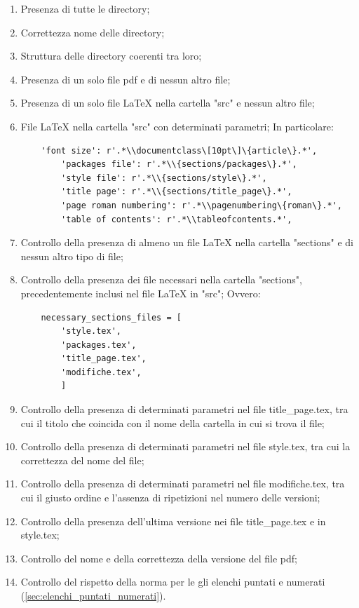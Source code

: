 \begin{enumerate}
	\item Presenza di tutte le directory;
	\item Correttezza nome delle directory;
	\item Struttura delle directory coerenti tra loro;
	\item Presenza di un solo file pdf e di nessun altro file;
	\item Presenza di un solo file LaTeX nella cartella "src" e nessun altro file;
	\item File LaTeX nella cartella "src" con determinati parametri;
	\newline In particolare:
	\begin{lstlisting}
	'font size': r'.*\\documentclass\[10pt\]\{article\}.*',
        'packages file': r'.*\\{sections/packages\}.*',
        'style file': r'.*\\{sections/style\}.*',
        'title page': r'.*\\{sections/title_page\}.*',
        'page roman numbering': r'.*\\pagenumbering\{roman\}.*',
        'table of contents': r'.*\\tableofcontents.*',
	\end{lstlisting}
	\item Controllo della presenza di almeno un file LaTeX nella cartella "sections" e di nessun altro tipo di file;
	\item Controllo della presenza dei file necessari nella cartella "sections", precedentemente inclusi nel file LaTeX in "src";
	Ovvero:
	\begin{lstlisting}
	necessary_sections_files = [
        'style.tex',
        'packages.tex',
        'title_page.tex',
        'modifiche.tex',
    	]
	\end{lstlisting}
	\item Controllo della presenza di determinati parametri nel file title\_page.tex, tra cui il titolo che coincida con il nome della cartella in cui si trova il file;
	\item Controllo della presenza di determinati parametri nel file style.tex, tra cui la correttezza del nome del file;
	\item Controllo della presenza di determinati parametri nel file modifiche.tex, tra cui il giusto ordine e l'assenza di ripetizioni nel numero delle versioni;
	\item Controllo della presenza dell'ultima versione nei file title\_page.tex e in style.tex;
	\item Controllo del nome e della correttezza della versione del file pdf;
	\item Controllo del rispetto della norma per le gli elenchi puntati e numerati (\ref{sec:elenchi_puntati_numerati}).
\end{enumerate}

